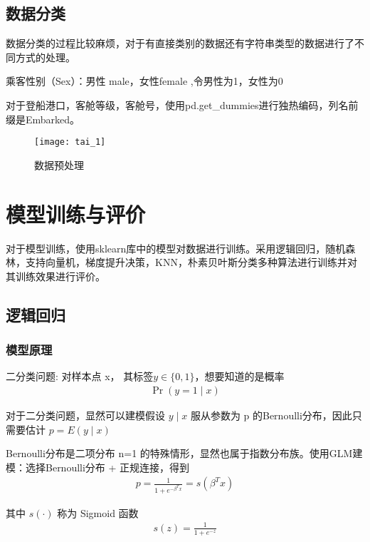 \documentclass[withoutpreface,bwprint]{cumcmthesis} %
\begin{document}
	\subsection{数据分类}
	
	\par 数据分类的过程比较麻烦，对于有直接类别的数据还有字符串类型的数据进行了不同方式的处理。
	\par 乘客性别（Sex）：男性 male，女性female	,令男性为1，女性为0
	\par 对于登船港口，客舱等级，客舱号，使用pd.get\_dummies进行独热编码，列名前缀是Embarked。
	
	\begin{figure}[H]
		\centering
		\centerline{\texttt{[image: tai\_1]}}  
		\begin{center}
			\caption{数据预处理}
		\end{center}
	\end{figure}
	
\section{模型训练与评价}
\par 对于模型训练，使用sklearn库中的模型对数据进行训练。采用逻辑回归，随机森林，支持向量机，梯度提升决策，KNN，朴素贝叶斯分类多种算法进行训练并对其训练效果进行评价。
\subsection{逻辑回归}
\subsubsection{模型原理}
\par 二分类问题: 对样本点 x， 其标签$y \in\{0,1\} $，想要知道的是概率
\begin{align}
	\operatorname{Pr}(y=1 \mid x)
\end{align}
\par 对于二分类问题，显然可以建模假设  $y \mid x$  服从参数为  p  的Bernoulli分布，因此只需要估计 $ p=E(y \mid x) $

\par Bernoulli分布是二项分布  n=1  的特殊情形，显然也属于指数分布族。使用GLM建模：选择Bernoulli分布  +  正规连接，得到
\begin{align}
	p=\frac{1}{1+e^{-\beta^{T} x}}=s\left(\beta^{T} x\right)
\end{align}


\par 其中  $s(\cdot)$  称为 Sigmoid 函数
\begin{align}
s(z)=\frac{1}{1+e^{-z}}
\end{align}
\end{document}
